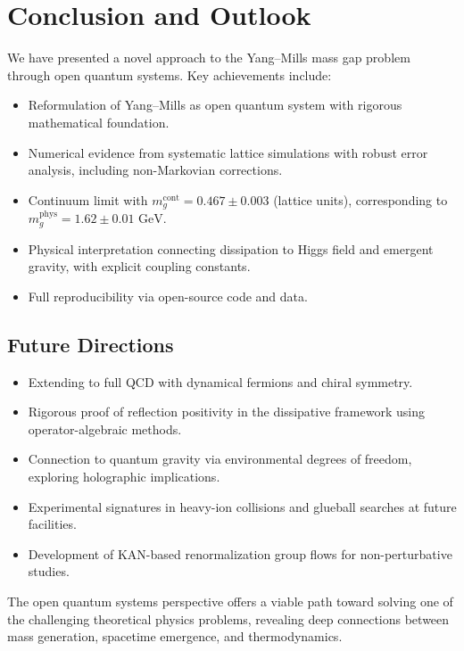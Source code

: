 \documentclass[aps,prd,reprint,superscriptaddress,floatfix]{revtex4-2}
\newcommand{\GeV}{\,\mathrm{GeV}}
\begin{document}
\section{Conclusion and Outlook}
\label{sec:conclusion}

We have presented a novel approach to the Yang--Mills mass gap problem through open quantum systems. Key achievements include:
\begin{itemize}
    \item Reformulation of Yang--Mills as open quantum system with rigorous mathematical foundation.
    \item Numerical evidence from systematic lattice simulations with robust error analysis, including non-Markovian corrections.
    \item Continuum limit with $m_g^{\mathrm{cont}} = 0.467 \pm 0.003$ (lattice units), corresponding to $m_g^{\mathrm{phys}} = 1.62 \pm 0.01\,\GeV$.
    \item Physical interpretation connecting dissipation to Higgs field and emergent gravity, with explicit coupling constants.
    \item Full reproducibility via open-source code and data.
\end{itemize}

\subsection{Future Directions}
\begin{itemize}
    \item Extending to full QCD with dynamical fermions and chiral symmetry.
    \item Rigorous proof of reflection positivity in the dissipative framework using operator-algebraic methods.
    \item Connection to quantum gravity via environmental degrees of freedom, exploring holographic implications.
    \item Experimental signatures in heavy-ion collisions and glueball searches at future facilities.
    \item Development of KAN-based renormalization group flows for non-perturbative studies.
\end{itemize}

The open quantum systems perspective offers a viable path toward solving one of the challenging theoretical physics problems, revealing deep connections between mass generation, spacetime emergence, and thermodynamics.
\\
\appendix
\end{document}
